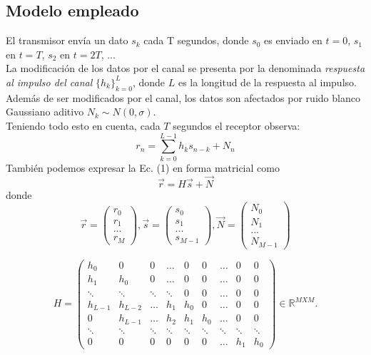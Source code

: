 \documentclass[10pt,journal,compsoc]{IEEEtran}
\begin{document}
\subsection{Modelo empleado}
El transmisor env\'ia un dato ${s_{k}}$ cada T segundos, donde ${s_0}$ es enviado en $t = 0$, ${s_1}$ en $t = T$, ${s_2}$ en $t = 2T$, ...\\
La modificaci\'on de los datos por el canal se presenta por la denominada \textit{respuesta al impulso del canal} $\{{h_{k}\}}_{k=0}^{L}$, donde $L$ es la longitud de la respuesta al impulso. \\
Adem\'as de ser modificados por el canal, los datos son afectados por ruido blanco Gaussiano aditivo ${N_k}\sim N(0, \sigma)$.\\
Teniendo todo esto en cuenta, cada $T$ segundos el receptor observa: \\
\begin{equation}
r_n = \sum_{k=0}^{L-1} {h_{k}s_{n-k}}+N_n
\end{equation}
Tambi\'en podemos expresar la Ec. (1) en forma matricial como
\begin{equation}
\vec{r} = H\vec{s}+\vec{N}
\end{equation}
donde
\begin{equation}
\vec{r} = \left(
\begin{array}{c}
r_0\\ r_1\\ ...\\r_M
\end{array}
\right)
 , \vec{s}= \left(
\begin{array}{c}
s_0\\ s_1\\ ...\\s_{M-1}
\end{array}
\right)  ,
\vec{N}=\left(
\begin{array}{c}
N_0\\ N_1\\ ...\\N_{M-1}
\end{array}
\right)
\end{equation}

\begin{equation}
H = \left(
\begin{array}{ccccccccc}
h_{0} & 0 & 0 & \ldots & 0 & 0 & \ldots & 0 & 0\\ 
h_1 & h_0 &0&\ldots&0&0&\ldots&0&0 \\
\ddots & \ddots & \ddots & \ddots &0&0& \ldots&0&0\\
h_{L-1} &h_{L-2} &   \ldots & h_{1} & h_{0} &0 & \ldots & 0 & 0\\
0 &h_{L-1} &  \ldots & h_{2} & h_{1} & h_{0} & \ldots & 0 & 0 \\
\ddots&\ddots&\ddots&\ddots&\ddots&\ddots&\ddots&\ddots & \ddots \\ 
0&0&0&0&0&0&\ldots&h_1 & h_0
\end{array}
\right)  \in \mathbb{R}^{M X M}.
\end{equation}
\end{document}
